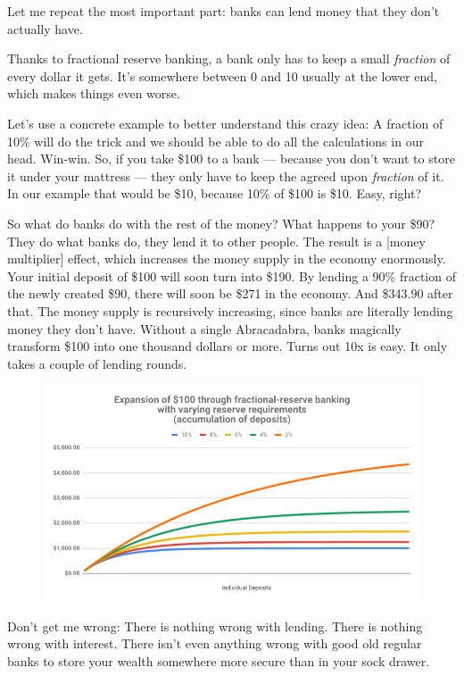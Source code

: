 Let me repeat the most important part: banks can lend money that they
don't actually have.

Thanks to fractional reserve banking, a bank only has to keep a small
\textit{fraction} of every dollar it gets. It's somewhere between 0 and 10%
usually at the lower end, which makes things even worse.

Let's use a concrete example to better understand this crazy idea: A
fraction of 10\% will do the trick and we should be able to do all the
calculations in our head. Win-win. So, if you take \$100 to a
bank --- because you don't want to store it under your mattress --- they
only have to keep the agreed upon \textit{fraction} of it. In our example that
would be \$10, because 10\% of \$100 is \$10. Easy, right?

So what do banks do with the rest of the money? What happens to your
\$90? They do what banks do, they lend it to other people. The result is
a [money multiplier] effect, which increases the money supply in the
economy enormously. Your initial deposit of \$100 will soon turn into
\$190. By lending a 90\% fraction of the newly created \$90, there will
soon be \$271 in the economy. And \$343.90 after that. The money supply
is recursively increasing, since banks are literally lending money they
don't have. Without a single Abracadabra, banks magically transform
\$100 into one thousand dollars or more. Turns out 10x is easy. It only
takes a couple of lending rounds.

\begin{figure}
  \centering
  \includegraphics{assets/images/money-multiplier.png}
  \label{fig:money-multiplier}
\end{figure}

Don't get me wrong: There is nothing wrong with lending. There is
nothing wrong with interest. There isn't even anything wrong with good
old regular banks to store your wealth somewhere more secure than in
your sock drawer.

